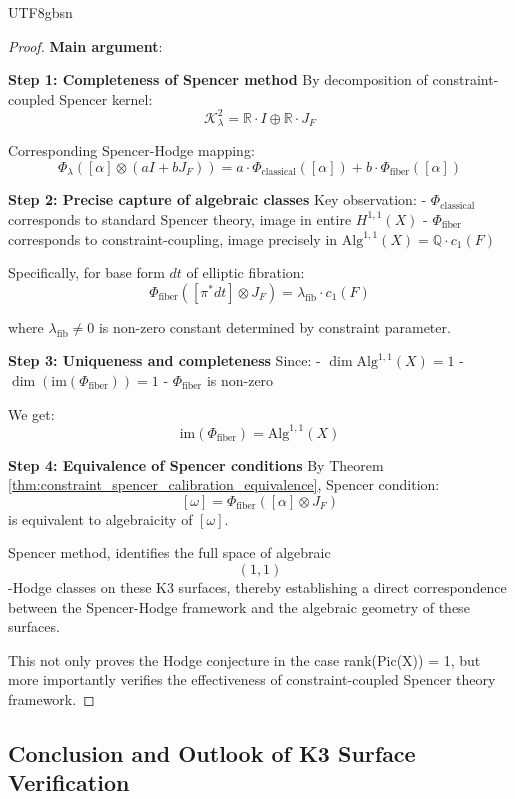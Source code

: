 \documentclass[a4paper,12pt]{extarticle}
\theoremstyle{definition}
\begin{document}
\begin{CJK}{UTF8}{gbsn}
\begin{proof}
\textbf{Main argument}:

\textbf{Step 1: Completeness of Spencer method}
By decomposition of constraint-coupled Spencer kernel:
$$\mathcal{K}^2_\lambda = \mathbb{R} \cdot I \oplus \mathbb{R} \cdot J_F$$

Corresponding Spencer-Hodge mapping:
$$\Phi_\lambda([\alpha] \otimes (aI + bJ_F)) = a \cdot \Phi_{\text{classical}}([\alpha]) + b \cdot \Phi_{\text{fiber}}([\alpha])$$

\textbf{Step 2: Precise capture of algebraic classes}
Key observation:
- $\Phi_{\text{classical}}$ corresponds to standard Spencer theory, image in entire $H^{1,1}(X)$
- $\Phi_{\text{fiber}}$ corresponds to constraint-coupling, image precisely in $\text{Alg}^{1,1}(X) = \mathbb{Q} \cdot c_1(F)$

Specifically, for base form $dt$ of elliptic fibration:
$$\Phi_{\text{fiber}}([\pi^* dt] \otimes J_F) = \lambda_{\text{fib}} \cdot c_1(F)$$

where $\lambda_{\text{fib}} \neq 0$ is non-zero constant determined by constraint parameter.

\textbf{Step 3: Uniqueness and completeness}
Since:
- $\dim \text{Alg}^{1,1}(X) = 1$
- $\dim(\text{im}(\Phi_{\text{fiber}})) = 1$  
- $\Phi_{\text{fiber}}$ is non-zero

We get:
$$\text{im}(\Phi_{\text{fiber}}) = \text{Alg}^{1,1}(X)$$

\textbf{Step 4: Equivalence of Spencer conditions}
By Theorem \ref{thm:constraint_spencer_calibration_equivalence}, Spencer condition:
$$[\omega] = \Phi_{\text{fiber}}([\alpha] \otimes J_F)$$
is equivalent to algebraicity of $[\omega]$.

Spencer method, identifies the full space of algebraic $$(1, 1)$$-Hodge classes on these K3 surfaces, thereby establishing a direct correspondence between the Spencer-Hodge framework and the algebraic geometry of these surfaces.

This not only proves the Hodge conjecture in the case rank(Pic(X)) = 1, but more importantly verifies the effectiveness of constraint-coupled Spencer theory framework.
\end{proof}

\subsection{Conclusion and Outlook of K3 Surface Verification}
\label{subsec:conclusion_and_outlook}


\end{CJK}
\end{document}
